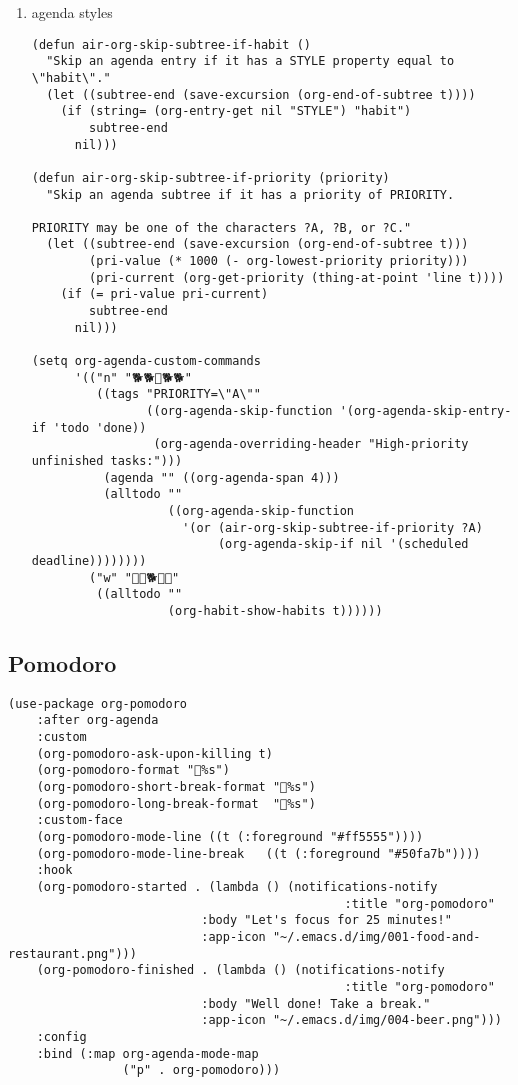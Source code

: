 \documentclass[11pt]{article}
\begin{document}
\begin{enumerate}
\item agenda styles
\label{sec:org5e34d5a}
\begin{verbatim}
(defun air-org-skip-subtree-if-habit ()
  "Skip an agenda entry if it has a STYLE property equal to \"habit\"."
  (let ((subtree-end (save-excursion (org-end-of-subtree t))))
    (if (string= (org-entry-get nil "STYLE") "habit")
        subtree-end
      nil)))

(defun air-org-skip-subtree-if-priority (priority)
  "Skip an agenda subtree if it has a priority of PRIORITY.

PRIORITY may be one of the characters ?A, ?B, or ?C."
  (let ((subtree-end (save-excursion (org-end-of-subtree t)))
        (pri-value (* 1000 (- org-lowest-priority priority)))
        (pri-current (org-get-priority (thing-at-point 'line t))))
    (if (= pri-value pri-current)
        subtree-end
      nil)))

(setq org-agenda-custom-commands
      '(("n" "🐕🐕🐩🐕🐕"
         ((tags "PRIORITY=\"A\""
                ((org-agenda-skip-function '(org-agenda-skip-entry-if 'todo 'done))
                 (org-agenda-overriding-header "High-priority unfinished tasks:")))
          (agenda "" ((org-agenda-span 4)))
          (alltodo ""
                   ((org-agenda-skip-function
                     '(or (air-org-skip-subtree-if-priority ?A)
                          (org-agenda-skip-if nil '(scheduled deadline))))))))
        ("w" "🐩🐩🐕🐩🐩"
         ((alltodo ""
                   (org-habit-show-habits t))))))

\end{verbatim}
\end{enumerate}
\subsection{Pomodoro}
\label{sec:org4c85195}
\begin{verbatim}
(use-package org-pomodoro
    :after org-agenda
    :custom
    (org-pomodoro-ask-upon-killing t)
    (org-pomodoro-format "%s")
    (org-pomodoro-short-break-format "%s")
    (org-pomodoro-long-break-format  "%s")
    :custom-face
    (org-pomodoro-mode-line ((t (:foreground "#ff5555"))))
    (org-pomodoro-mode-line-break   ((t (:foreground "#50fa7b"))))
    :hook
    (org-pomodoro-started . (lambda () (notifications-notify
                                               :title "org-pomodoro"
                           :body "Let's focus for 25 minutes!"
                           :app-icon "~/.emacs.d/img/001-food-and-restaurant.png")))
    (org-pomodoro-finished . (lambda () (notifications-notify
                                               :title "org-pomodoro"
                           :body "Well done! Take a break."
                           :app-icon "~/.emacs.d/img/004-beer.png")))
    :config
    :bind (:map org-agenda-mode-map
                ("p" . org-pomodoro)))

\end{verbatim}
\end{document}
